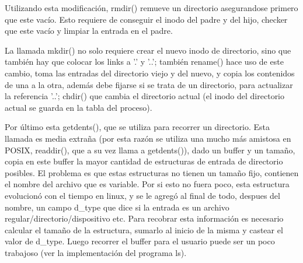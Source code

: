 Utilizando esta modificación, rmdir() remueve un directorio asegurandose
primero que este vacío. Esto requiere de conseguir el inodo del padre y del
hijo, checker que este vacío y limpiar la entrada en el padre.

La llamada mkdir() no solo requiere crear el nuevo inodo de directorio, sino que
también hay que colocar los links a '.' y '..'; también rename() hace uso de
este cambio, toma las entradas del directorio viejo y del nuevo, y copia los
contenidos de una a la otra, además debe fijarse si se trata de un directorio,
para actualizar la referencia '..'; chdir() que cambia el directorio actual
(el inodo del directorio actual se guarda en la tabla del proceso).

Por último esta getdents(), que se utiliza para recorrer un directorio. Esta
llamada es media extraña (por esta razón se utiliza una mucho más amistosa en
POSIX, readdir(), que a su vez llama a getdents()), dado un buffer y un tamaño,
copia en este buffer la mayor cantidad de estructuras de entrada de directorio
posibles. El problema es que estas estructuras no tienen un tamaño fijo,
contienen el nombre del archivo que es variable. Por si esto no fuera poco,
esta estructura evolucionó con el tiempo en linux, y se le agregó al final de
todo, despues del nombre, un campo d\_type que dice si la entrada es un archivo
regular/directorio/dispositivo etc. Para recobrar esta información es necesario
calcular el tamaño de la estructura, sumarlo al inicio de la misma y castear el
valor de d\_type. Luego recorrer el buffer para el usuario puede ser un poco
trabajoso (ver la implementación del programa ls).
